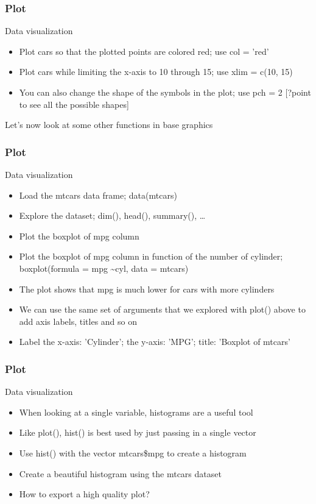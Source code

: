 \documentclass{beamer}
\begin{document}
\begin{frame}[fragile]
	\frametitle{Plot}
	\centering \Large Data visualization
	\begin{itemize}
		\small
		\item Plot cars so that the plotted points are colored red; use col = 'red'
	\pause 
		\item Plot cars while limiting the x-axis to 10 through 15; use xlim = c(10, 15)
	\pause
		\item You can also change the shape of the symbols in the plot; use pch = 2 \tiny [?point to see all the possible shapes]
	\end{itemize}

	\vspace{20pt}

	\begin{center} Let's now look at some other functions in base graphics \end{center}
\end{frame}


\begin{frame}[fragile]
	\frametitle{Plot}
	\centering \Large Data visualization
	\begin{itemize}
		\small
		\item Load the mtcars data frame; data(mtcars)
	\pause 
		\item Explore the dataset; dim(), head(), summary(), \ldots
	\pause
		\item Plot the boxplot of mpg column
	\pause
		\item Plot the boxplot of mpg column in function of the number of cylinder; boxplot(formula = mpg \textasciitilde* cyl, data = mtcars)
	\pause
		\item The plot shows that mpg is much lower for cars with more cylinders
		\item We can use the same set of arguments that we explored with plot() above to add axis labels, titles and so on
		\item Label the x-axis: 'Cylinder'; the y-axis: 'MPG'; title: 'Boxplot of mtcars'
	\end{itemize}
\end{frame}

\begin{frame}[fragile]
	\frametitle{Plot}
	\centering \Large Data visualization
	\begin{itemize}
		\small
		\item When looking at a single variable, histograms are a useful tool
		\item Like plot(), hist() is best used by just passing in a single vector
		\item Use hist() with the vector mtcars\$mpg to create a histogram
	\pause
		\item Create a beautiful histogram using the mtcars dataset 
	\pause
		\item How to export a high quality plot?
	\end{itemize}
\end{frame}
\end{document}
